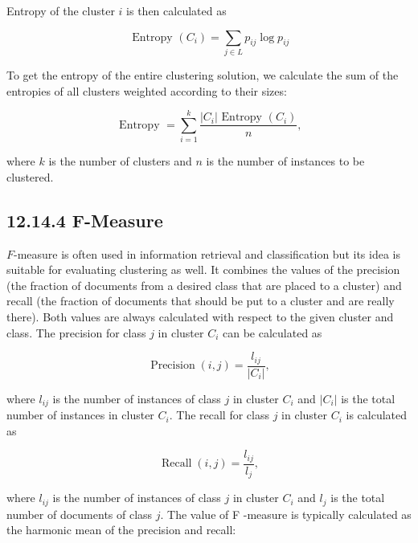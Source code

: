 \documentclass[10pt]{book}
\begin{document}
Entropy of the cluster $i$ is then calculated as


\begin{equation*}
\text { Entropy }\left(C_{i}\right)=\sum_{j \in L} p_{i j} \log p_{i j} \tag{12.43}
\end{equation*}


To get the entropy of the entire clustering solution, we calculate the sum of the entropies of all clusters weighted according to their sizes:


\begin{equation*}
\text { Entropy }=\sum_{i=1}^{k} \frac{\left|C_{i}\right| \text { Entropy }\left(C_{i}\right)}{n}, \tag{12.44}
\end{equation*}


where $k$ is the number of clusters and $n$ is the number of instances to be clustered.

\subsection*{12.14.4 F-Measure}
$F$-measure is often used in information retrieval and classification but its idea is suitable for evaluating clustering as well. It combines the values of the precision (the fraction of documents from a desired class that are placed to a cluster) and recall (the fraction of documents that should be put to a cluster and are really there). Both values are always calculated with respect to the given cluster and class. The precision for class $j$ in cluster $C_{i}$ can be calculated as


\begin{equation*}
\operatorname{Precision}(i, j)=\frac{l_{i j}}{\left|C_{i}\right|}, \tag{12.45}
\end{equation*}


where $l_{i j}$ is the number of instances of class $j$ in cluster $C_{i}$ and $\left|C_{i}\right|$ is the total number of instances in cluster $C_{i}$. The recall for class $j$ in cluster $C_{i}$ is calculated as


\begin{equation*}
\operatorname{Recall}(i, j)=\frac{l_{i j}}{l_{j}}, \tag{12.46}
\end{equation*}


where $l_{i j}$ is the number of instances of class $j$ in cluster $C_{i}$ and $l_{j}$ is the total number of documents of class $j$. The value of F -measure is typically calculated as the harmonic mean of the precision and recall:
\end{document}
